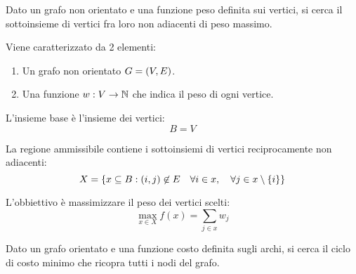\documentclass[\main/main.tex]{subfiles}
\begin{document}
\begin{multicols}{2}
    \begin{problem}
        Dato un grafo non orientato e una funzione peso definita sui vertici, si cerca il sottoinsieme di vertici fra loro non adiacenti di peso massimo.
        
        Viene caratterizzato da 2 elementi:
        \begin{enumerate}
            \item Un grafo non orientato \(G = \left(V, E\right)\).
            \item Una funzione \(w: V \rightarrow \mathbb{N}\) che indica il peso di ogni vertice.
        \end{enumerate}
    \end{problem}
    \begin{definition}
        L'insieme base è l'insieme dei vertici:
        \[
            B = V
        \]
    \end{definition}
    \begin{definition}
        La regione ammissibile contiene i sottoinsiemi di vertici reciprocamente non adiacenti:
        \[
            X = \left\{x \subseteq B: \left(i,j\right) \not\in E \quad \forall i \in x, \quad \forall j \in x \setminus \left\{i\right\}\right\}
        \]
    \end{definition}
    \begin{definition}
        L'obbiettivo è massimizzare il peso dei vertici scelti:
        \[
            \max_{x \in X} f(x) = \sum_{j \in x} w_j
        \]
    \end{definition}
    \begin{problem}
        Dato un grafo orientato e una funzione costo definita sugli archi, si cerca il ciclo di costo minimo che ricopra tutti i nodi del grafo.
    

\end{problem}
\end{multicols}
\end{document}
